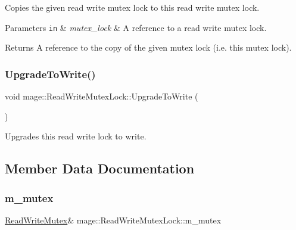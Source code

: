 Copies the given read write mutex lock to this read write mutex lock.


\begin{DoxyParams}[1]{Parameters}
\mbox{\tt in}  & {\em mutex\+\_\+lock} & A reference to a read write mutex lock. \\
\hline
\end{DoxyParams}
\begin{DoxyReturn}{Returns}
A reference to the copy of the given mutex lock (i.\+e. this mutex lock). 
\end{DoxyReturn}
\hypertarget{structmage_1_1_read_write_mutex_lock_a01843784e8dbf0d3dfd6100562f699be}{}\label{structmage_1_1_read_write_mutex_lock_a01843784e8dbf0d3dfd6100562f699be} 
\subsubsection{\texorpdfstring{Upgrade\+To\+Write()}{UpgradeToWrite()}}
{\footnotesize\ttfamily void mage\+::\+Read\+Write\+Mutex\+Lock\+::\+Upgrade\+To\+Write (\begin{DoxyParamCaption}{ }\end{DoxyParamCaption})}

Upgrades this read write lock to write. 

\subsection{Member Data Documentation}
\hypertarget{structmage_1_1_read_write_mutex_lock_a6ee9034fa984e11ec07c20ec77ab1bfe}{}\label{structmage_1_1_read_write_mutex_lock_a6ee9034fa984e11ec07c20ec77ab1bfe} 
\subsubsection{\texorpdfstring{m\+\_\+mutex}{m\_mutex}}
{\footnotesize\ttfamily \hyperlink{classmage_1_1_read_write_mutex}{Read\+Write\+Mutex}\& mage\+::\+Read\+Write\+Mutex\+Lock\+::m\+\_\+mutex\hspace{0.3cm}{\ttfamily [private]}}

